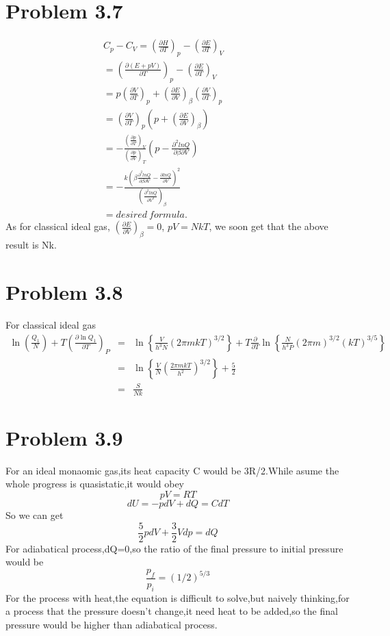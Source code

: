 \documentclass{article}
\begin{document}
\section*{Problem 3.7}
\begin{eqnarray*}
C_p-C_V=(\frac{\partial H}{\partial T})_p-(\frac{\partial E}{\partial T})_V   \qquad\quad\\
=(\frac{\partial (E+pV)}{\partial T})_p-(\frac{\partial E}{\partial T})_V   \\
=p (\frac{\partial V}{\partial T})_p+(\frac{\partial E}{\partial V})_{\beta}(\frac{\partial V}{\partial T})_p  \\
=(\frac{\partial V}{\partial T})_p (p+(\frac{\partial E}{\partial V})_{\beta} ) \qquad \\
=-\frac{(\frac{\partial p}{\partial T})_V}{(\frac{\partial p}{\partial V})_T}(p-\frac{\partial^2 lnQ}{\partial \beta \partial V})  \quad \\
=-\frac{k(\beta \frac{\partial^2 ln Q}{\partial \beta \partial V}-\frac{\partial lnQ}{\partial V})^2}{(\frac{\partial^2 lnQ}{\partial V^2})_{\beta}} \quad\\
=desired \ formula.\qquad 
\end{eqnarray*}
As for classical ideal gas, $(\frac{\partial E}{\partial V})_{\beta}=0$, $pV=NkT$, we soon get that the above result is Nk.


\section*{Problem 3.8}
For classical ideal gas
\begin{eqnarray*}
\ln\left(\frac{Q_1}{N}\right)+T\left(\frac{\partial \ln Q_1}{\partial T}\right)_P&=&\ln\left\{\frac{V}{h^3N}(2\pi mkT)^{3/2}\right\}+T\frac{\partial}{\partial T}\ln\left\{\frac{N}{h^3P}(2\pi m)^{3/2}(kT)^{3/5}\right\}\\
&=&\ln\left\{\frac{V}{N}(\frac{2\pi mkT}{h^2})^{3/2}\right\}+\frac{5}{2}\\
&=&\frac{S}{Nk}
\end{eqnarray*}

 \section*{Problem 3.9}
 	For an ideal monaomic gas,its heat capacity C would be 3R/2.While asume the whole progress is quasistatic,it would obey 
 	\begin{equation*}
		pV=RT
	\end{equation*}
	\begin{equation*}
		dU=-pdV+dQ=CdT
	\end{equation*}
	So we can get
	\begin{equation*}
		\frac{5}{2}pdV+\frac{3}{2}Vdp=dQ
	\end{equation*}
	For adiabatical process,dQ=0,so the ratio of the final pressure to initial pressure would be
	\begin{equation*}
		\frac{p_f}{p_i}=(1/2)^{5/3}
	\end{equation*}
	For the process with heat,the equation is difficult to solve,but naively thinking,for a process that the pressure doesn't change,it need heat to be added,so the final pressure would be higher than adiabatical process.
	
\end{document}
